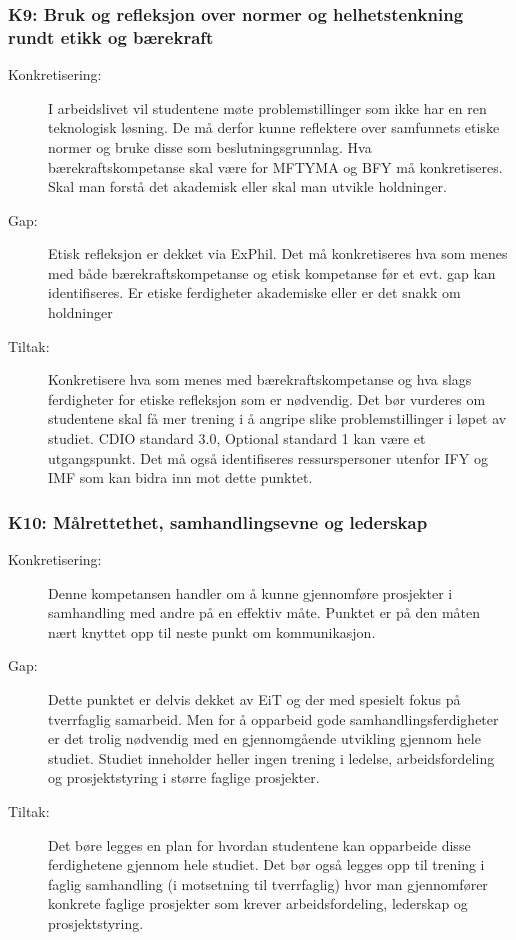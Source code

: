 \subsubsection{K9: Bruk og refleksjon over normer og helhetstenkning rundt etikk og bærekraft} 
\begin{description}
\item[Konkretisering:] I arbeidslivet vil studentene møte problemstillinger som ikke har en ren teknologisk løsning. De må derfor kunne reflektere over samfunnets etiske normer og bruke disse som beslutningsgrunnlag. Hva bærekraftskompetanse skal være for MFTYMA og BFY må konkretiseres. Skal man forstå det akademisk eller skal man utvikle holdninger.
\item[Gap:] Etisk refleksjon er dekket via ExPhil. Det må konkretiseres hva som menes med både bærekraftskompetanse og etisk kompetanse før et evt. gap kan identifiseres. Er etiske ferdigheter akademiske eller er det snakk om holdninger
\item[Tiltak:] Konkretisere hva som menes med bærekraftskompetanse og hva slags ferdigheter for etiske refleksjon som er nødvendig.  Det bør vurderes om studentene skal få mer trening i å angripe slike problemstillinger i løpet av studiet. CDIO standard 3.0, Optional standard 1 kan være et utgangspunkt. Det må også identifiseres ressurspersoner utenfor IFY og IMF som kan bidra inn mot dette punktet.
\end{description}

\subsubsection{K10: Målrettethet, samhandlingsevne og lederskap}
\begin{description}
\item[Konkretisering:] Denne kompetansen handler om å kunne gjennomføre prosjekter i samhandling med andre på en effektiv måte. Punktet er på den måten nært knyttet opp til neste punkt om kommunikasjon.
\item[Gap:]Dette punktet er delvis dekket av EiT og der med spesielt fokus på tverrfaglig samarbeid. Men for å opparbeid gode samhandlingsferdigheter er det trolig nødvendig med en gjennomgående utvikling gjennom hele studiet. Studiet inneholder heller ingen trening i ledelse, arbeidsfordeling og prosjektstyring i større faglige prosjekter.
\item[Tiltak:] Det børe legges en plan for hvordan studentene kan opparbeide disse ferdighetene gjennom hele studiet. Det bør også legges opp til trening i faglig samhandling (i motsetning til tverrfaglig) hvor man gjennomfører konkrete faglige prosjekter som krever arbeidsfordeling, lederskap og prosjektstyring. 
\end{description}

